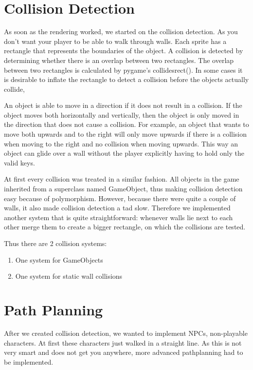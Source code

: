 \documentclass[a4paper,pdf,12pt]{article}
\begin{document}

\section{Collision Detection}
\label{sec:Collision Detection}
As soon as the rendering worked, we started on the collision detection. As you don't want your player to be able to walk through walls. Each sprite has a rectangle that represents the boundaries of the object. A collision is detected by determining whether there is an overlap between two rectangles. The overlap between two rectangles is calculated by pygame's collidesrect(). In some cases it is desirable to inflate the rectangle to detect a collision before the objects actually collide,

An object is able to move in a direction if it does not result in a collision. If the object moves both horizontally and vertically, then the object is only moved in the direction that does not cause a collision. For example, an object that wants to move both upwards and to the right will only move upwards if there is a collision when moving to the right and no collision when moving upwards. This way an object can glide over a wall without the player explicitly having to hold only the valid keys. 

At first every collision was treated in a similar fashion. All objects in the game inherited from a superclass named GameObject, thus making collision detection easy because of polymorphism. However, because there were quite a couple of walls, it also made collision detection a tad slow. Therefore we implemented another system that is quite straightforward: whenever walls lie next to each other merge them to create a bigger rectangle, on which the collisions are tested.

Thus there are 2 collision systems:
\begin{enumerate}
\item One system for GameObjects
\item One system for static wall collisions
\end{enumerate}

\section{Path Planning}
\label{sec:Path Planning}

After we created collision detection, we wanted to implement NPCs, non-playable characters. At first these characters just walked in a straight line. As this is not very smart and does not get you anywhere, more advanced pathplanning had to be implemented. 
\end{document}
